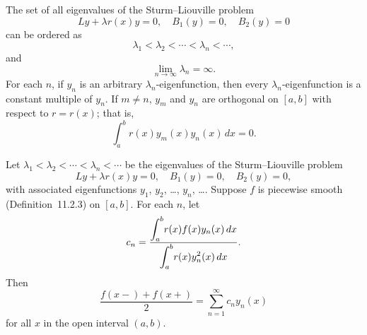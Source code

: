 \setcounter{theorem}{5}
\setcounter{equation}{26}
\begin{theorem}
  \label{thmtype:13.2.6} The set of all eigenvalues of the Sturm--Liouville problem
  \[
    Ly+\lambda r(x)y=0,\quad B_{1}(y)=0,\quad B_{2}(y)=0
  \]
  can be ordered as
  \[
    \lambda_{1}<\lambda_{2}<\cdots<\lambda_{n}<\cdots,
  \]
  and
  \[
    \lim_{n\to\infty}\lambda_{n}=\infty.
  \]
  For each $n$, if $y_{n}$ is an arbitrary $\lambda_{n}$-eigenfunction, then every
  $\lambda_{n}$-eigenfunction is a constant multiple of $y_{n}$. If $m\ne n$, $y_{m}$ and $y_{n}$
  are orthogonal on $[a,b]$ with respect to $r=r(x)$; that is,
  \begin{equation}
    \label{eq:13.2.27}\int_{a}^{b}r(x)y_{m}(x)y_{n}(x)\,dx=0.
  \end{equation}
\end{theorem}

\setcounter{theorem}{6}
\begin{theorem}
  \label{thmtype:13.2.7} Let $\lambda_{1}<\lambda_{2}<\cdots<\lambda_{n}<\cdots$ be the eigenvalues
  of the Sturm--Liouville problem
  \[
    Ly+\lambda r(x)y=0,\quad B_{1}(y)=0,\quad B_{2}(y)=0,
  \]
  with associated eigenfunctions $y_{1}$, $y_{2}$, \dots, $y_{n}$, \dots. Suppose $f$ is piecewise
  smooth (Definition~11.2.3) on $[a,b]$. For each $n$, let
  \[
    c_{n}=\frac{\displaystyle{\int_{a}^{b}}r(x)f(x)y_{n}(x)\,dx}{\displaystyle{\int_{a}^{b}}r(x)y_{n}^{2}(x)\,dx}.
  \]
  Then
  \[
    \frac{f(x-)+f(x+)}{2}=\sum_{n=1}^{\infty}c_{n}y_{n}(x)
  \]
  for all $x$ in the open interval $(a,b)$.
\end{theorem}


